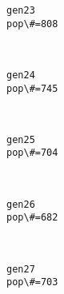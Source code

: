 \documentclass[11pt]{article}
\begin{document}
    \begin{Verbatim}[commandchars=\\\{\}]
gen23
pop\#=808

    \end{Verbatim}

    \begin{center}
    \end{center}
    { \hspace*{\fill} \\}
    
    \begin{Verbatim}[commandchars=\\\{\}]
gen24
pop\#=745

    \end{Verbatim}

    \begin{center}
    \end{center}
    { \hspace*{\fill} \\}
    
    \begin{Verbatim}[commandchars=\\\{\}]
gen25
pop\#=704

    \end{Verbatim}

    \begin{center}
    \end{center}
    { \hspace*{\fill} \\}
    
    \begin{Verbatim}[commandchars=\\\{\}]
gen26
pop\#=682

    \end{Verbatim}

    \begin{center}
    \end{center}
    { \hspace*{\fill} \\}
    
    \begin{Verbatim}[commandchars=\\\{\}]
gen27
pop\#=703

    \end{Verbatim}
\end{document}
